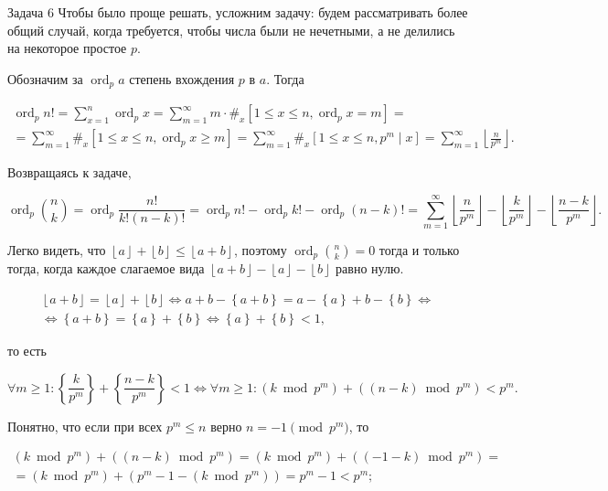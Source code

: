 \documentclass{article}
\DeclareMathOperator{\ord}{ord}
\newcommand{\floor}[1]{\left\lfloor#1\right\rfloor}
\newcommand{\fr}[1]{\left\{#1\right\}}
\begin{document}
	\begin{section}{Задача 6}
		Чтобы было проще решать, усложним задачу: будем рассматривать более общий случай, когда требуется, чтобы числа были не нечетными, а не делились на некоторое простое $p$.

		Обозначим за $\ord_p a$ степень вхождения $p$ в $a$. Тогда

		\begin{multline*}
			\ord_p n! = \sum_{x=1}^n \ord_p x = \sum_{m=1}^\infty m \cdot \#_x [1 \le x \le n, \ord_p x = m] = \\
			= \sum_{m=1}^\infty \#_x [1 \le x \le n, \ord_p x \ge m] = \sum_{m=1}^\infty \#_x [1 \le x \le n, p^m \mid x] = \sum_{m=1}^\infty \floor{\frac{n}{p^m}}.
		\end{multline*}

		Возвращаясь к задаче,

		\begin{equation*}
			\ord_p \binom{n}{k} = \ord_p \frac{n!}{k! (n-k)!} = \ord_p n! - \ord_p k! - \ord_p (n-k)! = \sum_{m=1}^\infty \floor{\frac{n}{p^m}} - \floor{\frac{k}{p^m}} - \floor{\frac{n-k}{p^m}}.
		\end{equation*}

		Легко видеть, что $\floor{a} + \floor{b} \le \floor{a+b}$, поэтому $\ord_p \binom{n}{k} = 0$ тогда и только тогда, когда каждое слагаемое вида $\floor{a+b} - \floor{a} - \floor{b}$ равно нулю.

		\begin{multline*}
			\floor{a+b} = \floor{a} + \floor{b} \iff a+b - \fr{a+b} = a - \fr{a} + b - \fr{b} \iff \\
			\iff \fr{a+b} = \fr{a} + \fr{b} \iff \fr{a} + \fr{b} < 1,
		\end{multline*}

		то есть

		\begin{equation*}
			\forall m \ge 1: \fr{\frac{k}{p^m}} + \fr{\frac{n-k}{p^m}} < 1 \iff \forall m \ge 1: (k \bmod p^m) + ((n-k) \bmod p^m) < p^m.
		\end{equation*}

		Понятно, что если при всех $p^m \le n$ верно $n = -1 \pmod{p^m}$, то

		\begin{multline*}
			(k \bmod p^m) + ((n-k) \bmod p^m) = (k \bmod p^m) + ((-1-k) \bmod p^m) = \\
			= (k \bmod p^m) + (p^m - 1 - (k \bmod p^m)) = p^m - 1 < p^m;
		\end{multline*}


\end{section}
\end{document}
